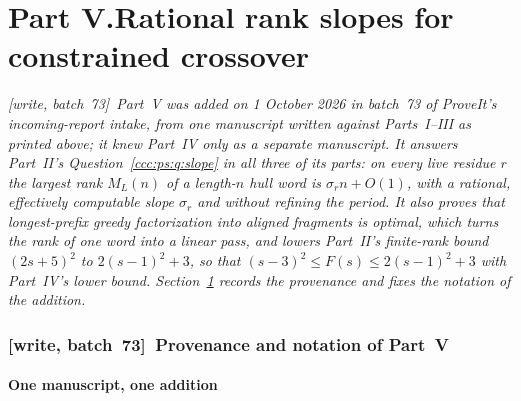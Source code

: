 \documentclass[11pt,letterpaper]{article}
\theoremstyle{definition}
\theoremstyle{remark}
\newcommand{\wsevthree}{\textup{[write, batch~73]}}
\begin{document}
\clearpage
{}\part*{Part V.\quad Rational rank slopes for constrained crossover}

\noindent\emph{\wsevthree\ Part~V was added on 1 October 2026 in batch~73 of
ProveIt's incoming-report intake, from one manuscript written against
Parts~I--III as printed above; it knew Part~IV only as a separate
manuscript. It answers Part~II's Question~\ref{ccc:ps:q:slope} in all three
of its parts: on every live residue $r$ the largest rank $M_L(n)$ of a
length-$n$ hull word is $\sigma_rn+O(1)$, with a rational, effectively
computable slope $\sigma_r$ and without refining the period. It also proves
that longest-prefix greedy factorization into aligned fragments is optimal,
which turns the rank of one word into a linear pass, and lowers Part~II's
finite-rank bound $(2s+5)^2$ to $2(s-1)^2+3$, so that
$(s-3)^2\le F(s)\le2(s-1)^2+3$ with Part~IV's lower bound.
Section~\ref{ccc:rs:sec:provenance} records the provenance and fixes the
notation of the addition.}

\section{\texorpdfstring{\wsevthree\ }{}Provenance and notation of Part~V}
\label{ccc:rs:sec:provenance}

\subsection{One manuscript, one addition}\label{ccc:rs:sec:source}
\end{document}
